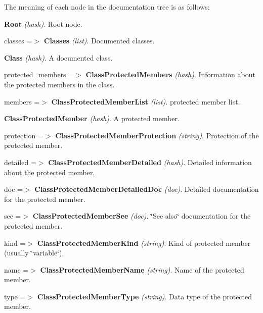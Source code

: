 The meaning of each node in the documentation tree is as follows: 
\begin{DoxyItemize}
\item {\bfseries Root} {\itshape (hash)\/}. Root node. 
\begin{DoxyItemize}
\item classes =$>$ {\bfseries Classes} {\itshape (list)\/}. Documented classes. 
\begin{DoxyItemize}
\item {\bfseries Class} {\itshape (hash)\/}. A documented class. 
\begin{DoxyItemize}
\item protected\_\-members =$>$ {\bfseries ClassProtectedMembers} {\itshape (hash)\/}. Information about the protected members in the class. 
\begin{DoxyItemize}
\item members =$>$ {\bfseries ClassProtectedMemberList} {\itshape (list)\/}. protected member list. 
\begin{DoxyItemize}
\item {\bfseries ClassProtectedMember} {\itshape (hash)\/}. A protected member. 
\begin{DoxyItemize}
\item protection =$>$ {\bfseries ClassProtectedMemberProtection} {\itshape (string)\/}. Protection of the protected member. 
\item detailed =$>$ {\bfseries ClassProtectedMemberDetailed} {\itshape (hash)\/}. Detailed information about the protected member. 
\begin{DoxyItemize}
\item doc =$>$ {\bfseries ClassProtectedMemberDetailedDoc} {\itshape (doc)\/}. Detailed documentation for the protected member. 
\item see =$>$ {\bfseries ClassProtectedMemberSee} {\itshape (doc)\/}. \char`\"{}See also\char`\"{} documentation for the protected member. 
\end{DoxyItemize}
\item kind =$>$ {\bfseries ClassProtectedMemberKind} {\itshape (string)\/}. Kind of protected member (usually \char`\"{}variable\char`\"{}). 
\item name =$>$ {\bfseries ClassProtectedMemberName} {\itshape (string)\/}. Name of the protected member. 
\item type =$>$ {\bfseries ClassProtectedMemberType} {\itshape (string)\/}. Data type of the protected member. 
\end{DoxyItemize}
\end{DoxyItemize}

\end{DoxyItemize}
\end{DoxyItemize}
\end{DoxyItemize}
\end{DoxyItemize}
\end{DoxyItemize}
